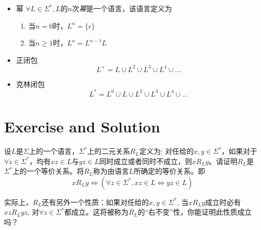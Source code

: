 \begin{itemize}
	\item 幂
	$\forall L\in\Sigma^{\ast},L$的$n$次\emph{幂}是一个语言，该语言定义为
	\begin{enumerate}
		\item 当$n=0$时，$L^n=\{\epsilon\}$
		\item 当$n\ge 1$时，$L^n=L^{n-1}L$
	\end{enumerate}
	\item 正闭包
	\[L^+=L\cup L^2\cup L^3\cup L^4 \cup\dots\]
	\item 克林闭包
	\[L^{\ast}=L^0\cup L\cup L^2\cup L^3\cup L^4 \cup\dots\]
\end{itemize}

\section{Exercise and Solution}

\begin{exercise}\label{Rl_def}
	设$L$是$\Sigma$上的一个语言，$\Sigma^\ast$上的二元关系$R_L$定义为: 对任给的$x,y\in\Sigma^\ast$，如果对于$\forall z\in\Sigma^\ast$，均有$xz\in L$与$yz\in L$同时成立或者同时不成立，则$xR_L y$。请证明$R_L$是$\Sigma^\ast$上的一个等价关系。将$R_L$称为由语言$L$所确定的等价关系。即
	$$xR_Ly\Leftrightarrow(\forall z\in\Sigma^\ast,xz\in L\Leftrightarrow yz\in L)$$
	
	实际上，$R_L$还有另外一个性质：如果对任给的$x,y\in\Sigma^\ast$, 当$xR_Ly$成立时必有$xzR_Lyz$, 对$\forall z\in\Sigma^\ast$都成立。这将被称为$R_L$的“右不变”性，你能证明此性质成立吗？
\end{exercise}

